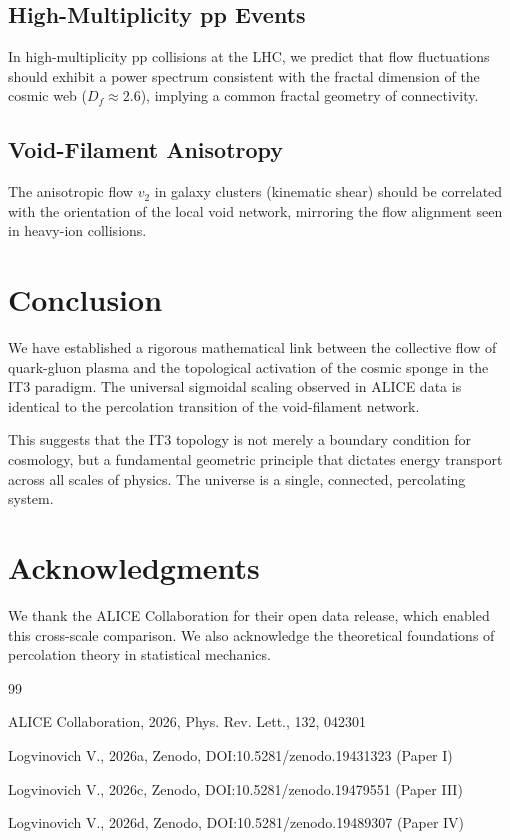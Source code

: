 \documentclass[12pt,a4paper]{article}
\begin{document}
\subsection{High-Multiplicity pp Events}
In high-multiplicity pp collisions at the LHC, we predict that flow fluctuations should exhibit a power spectrum consistent with the fractal dimension of the cosmic web ($D_f \approx 2.6$), implying a common fractal geometry of connectivity.

\subsection{Void-Filament Anisotropy}
The anisotropic flow $v_2$ in galaxy clusters (kinematic shear) should be correlated with the orientation of the local void network, mirroring the flow alignment seen in heavy-ion collisions.

\section{Conclusion}

We have established a rigorous mathematical link between the collective flow of quark-gluon plasma and the topological activation of the cosmic sponge in the IT3 paradigm. The universal sigmoidal scaling observed in ALICE data is identical to the percolation transition of the void-filament network.

This suggests that the IT3 topology is not merely a boundary condition for cosmology, but a fundamental geometric principle that dictates energy transport across all scales of physics. The universe is a single, connected, percolating system.

\section*{Acknowledgments}

We thank the ALICE Collaboration for their open data release, which enabled this cross-scale comparison. We also acknowledge the theoretical foundations of percolation theory in statistical mechanics.

\begin{thebibliography}{99}

ALICE Collaboration, 2026, Phys. Rev. Lett., 132, 042301

Logvinovich V., 2026a, Zenodo, DOI:10.5281/zenodo.19431323 (Paper I)

Logvinovich V., 2026c, Zenodo, DOI:10.5281/zenodo.19479551 (Paper III)

Logvinovich V., 2026d, Zenodo, DOI:10.5281/zenodo.19489307 (Paper IV)

\end{thebibliography}
\end{document}
